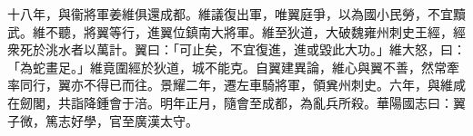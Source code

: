 \begin{pinyinscope}
十八年，與衞將軍姜維俱還成都。維議復出軍，唯翼庭爭，以為國小民勞，不宜黷武。維不聽，將翼等行，進翼位鎮南大將軍。維至狄道，大破魏雍州刺史王經，經衆死於洮水者以萬計。翼曰：「可止矣，不宜復進，進或毀此大功。」維大怒，曰：「為蛇畫足。」維竟圍經於狄道，城不能克。自翼建異論，維心與翼不善，然常牽率同行，翼亦不得已而往。景耀二年，遷左車騎將軍，領兾州刺史。六年，與維咸在劒閣，共詣降鍾會于涪。明年正月，隨會至成都，為亂兵所殺。華陽國志曰：翼子微，篤志好學，官至廣漢太守。


\end{pinyinscope}
